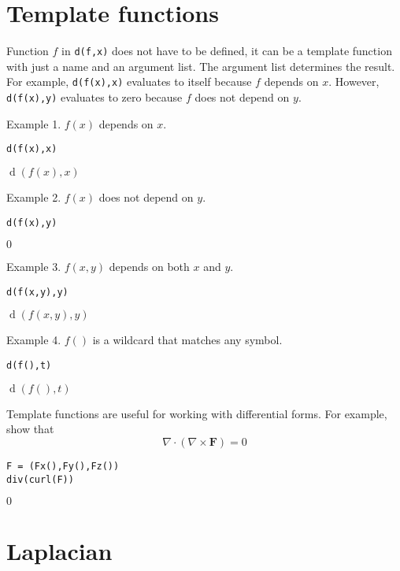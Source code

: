 \documentclass[12pt]{article}
\begin{document}
\newpage

\section{Template functions}

Function $f$ in \verb$d(f,x)$ does not have to be defined,
it can be a template function with just a name and an argument list.
The argument list determines the result.
For example, \verb$d(f(x),x)$ evaluates to itself because $f$ depends on $x$.
However, \verb$d(f(x),y)$ evaluates to zero because $f$ does not depend on $y$.

\bigskip
Example 1. $f(x)$ depends on $x$.

{\color{blue}
\begin{verbatim}
d(f(x),x)
\end{verbatim}}

$\operatorname{d}(f(x),x)$

\bigskip
Example 2. $f(x)$ does not depend on $y$.

{\color{blue}
\begin{verbatim}
d(f(x),y)
\end{verbatim}}

$0$

\bigskip
Example 3. $f(x,y)$ depends on both $x$ and $y$.

{\color{blue}
\begin{verbatim}
d(f(x,y),y)
\end{verbatim}}

$\operatorname{d}(f(x,y),y)$

\bigskip
Example 4. $f()$ is a wildcard that matches any symbol.

{\color{blue}
\begin{verbatim}
d(f(),t)
\end{verbatim}}

$\operatorname{d}(f(),t)$

\bigskip
Template functions are useful for working with differential forms.
For example, show that
\begin{equation*}
\nabla\cdot(\nabla\times\mathbf F)=0
\end{equation*}

{\color{blue}
\begin{verbatim}
F = (Fx(),Fy(),Fz())
div(curl(F))
\end{verbatim}}

$0$

\newpage

\section{Laplacian}
\end{document}

